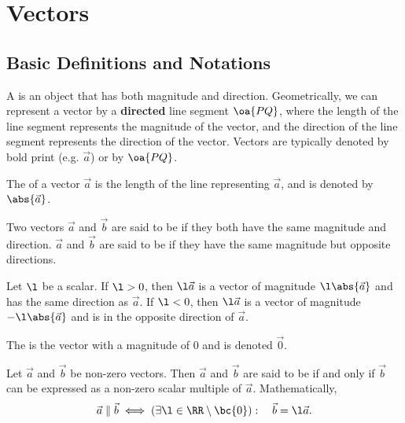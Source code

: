 \chapter{Vectors}

\section{Basic Definitions and Notations}

\begin{definition}
    A  is an object that has both magnitude and direction. Geometrically, we can represent a vector by a \textbf{directed} line segment $\oa{PQ}$, where the length of the line segment represents the magnitude of the vector, and the direction of the line segment represents the direction of the vector. Vectors are typically denoted by bold print (e.g. $\vec a$) or by $\oa{PQ}$.
\end{definition}

\begin{definition}
    The  of a vector $\vec a$ is the length of the line representing $\vec a$, and is denoted by $\abs{\vec a}$.
\end{definition}

\begin{definition}
    Two vectors $\vec a$ and $\vec b$ are said to be  if they both have the same magnitude and direction. $\vec a$ and $\vec b$ are said to be  if they have the same magnitude but opposite directions.
\end{definition}

\begin{definition}
    Let $\l$ be a scalar. If $\l > 0$, then $\l \vec a$ is a vector of magnitude $\l \abs{\vec a}$ and has the same direction as $\vec a$. If $\l < 0$, then $\l \vec a$ is a vector of magnitude $-\l \abs{\vec a}$ and is in the opposite direction of $\vec a$.
\end{definition}

\begin{definition}
    The  is the vector with a magnitude of 0 and is denoted $\vec 0$.
\end{definition}

\begin{definition}
    Let $\vec a$ and $\vec b$ be non-zero vectors. Then $\vec a$ and $\vec b$ are said to be  if and only if $\vec b$ can be expressed as a non-zero scalar multiple of $\vec a$. Mathematically, \[\vec a \parallel \vec b \iff (\exists \l \in \RR \setminus \bc{0}): \quad \vec b = \l \vec a.\]
\end{definition}

